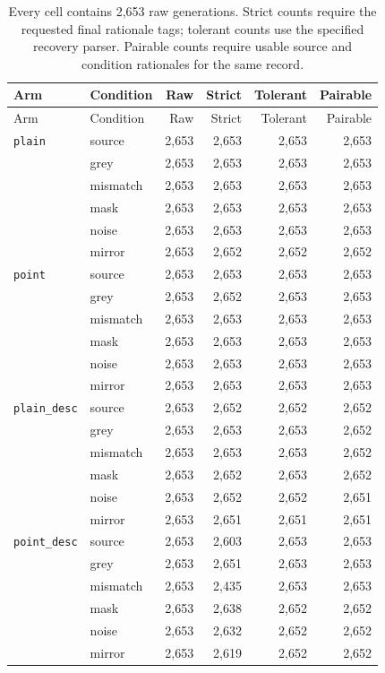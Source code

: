 \begin{longtable}{llrrrr}
\caption[Complete Stage~2 parse coverage]{Every cell contains 2,653 raw
generations. Strict counts require the requested final rationale tags; tolerant
counts use the specified recovery parser. Pairable counts require usable source
and condition rationales for the same record.}\label{tab:app-rq2-coverage}\\
\toprule
Arm & Condition & Raw & Strict & Tolerant & Pairable \\
\midrule
\endfirsthead
\toprule
Arm & Condition & Raw & Strict & Tolerant & Pairable \\
\midrule
\endhead
\texttt{plain} & source & 2,653 & 2,653 & 2,653 & 2,653 \\
 & grey & 2,653 & 2,653 & 2,653 & 2,653 \\
 & mismatch & 2,653 & 2,653 & 2,653 & 2,653 \\
 & mask & 2,653 & 2,653 & 2,653 & 2,653 \\
 & noise & 2,653 & 2,653 & 2,653 & 2,653 \\
 & mirror & 2,653 & 2,652 & 2,652 & 2,652 \\
\texttt{point} & source & 2,653 & 2,653 & 2,653 & 2,653 \\
 & grey & 2,653 & 2,652 & 2,653 & 2,653 \\
 & mismatch & 2,653 & 2,653 & 2,653 & 2,653 \\
 & mask & 2,653 & 2,653 & 2,653 & 2,653 \\
 & noise & 2,653 & 2,653 & 2,653 & 2,653 \\
 & mirror & 2,653 & 2,653 & 2,653 & 2,653 \\
\texttt{plain\_desc} & source & 2,653 & 2,652 & 2,652 & 2,652 \\
 & grey & 2,653 & 2,653 & 2,653 & 2,652 \\
 & mismatch & 2,653 & 2,653 & 2,653 & 2,652 \\
 & mask & 2,653 & 2,652 & 2,653 & 2,652 \\
 & noise & 2,653 & 2,652 & 2,652 & 2,651 \\
 & mirror & 2,653 & 2,651 & 2,651 & 2,651 \\
\texttt{point\_desc} & source & 2,653 & 2,603 & 2,653 & 2,653 \\
 & grey & 2,653 & 2,651 & 2,653 & 2,653 \\
 & mismatch & 2,653 & 2,435 & 2,653 & 2,653 \\
 & mask & 2,653 & 2,638 & 2,652 & 2,652 \\
 & noise & 2,653 & 2,632 & 2,652 & 2,652 \\
 & mirror & 2,653 & 2,619 & 2,652 & 2,652 \\
\bottomrule
\end{longtable}
